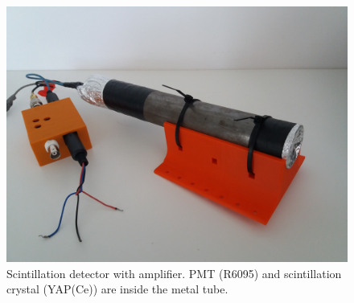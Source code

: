 \begin{figure}[H]
 \centering
\includegraphics[scale=0.1, angle = 0]{./pictures/Scintillator.jpg}
 \caption{Scintillation detector with amplifier. PMT (R6095) and scintillation crystal (YAP(Ce)) are inside the metal tube.}
 \label{scintillator}
 
\end{figure}


